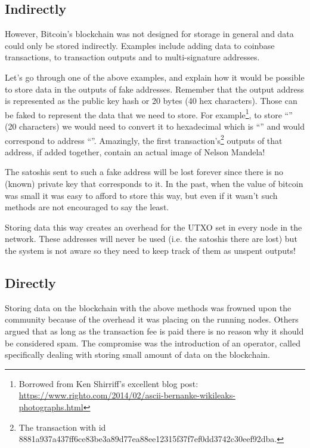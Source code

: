 \subsection*{Indirectly}
However, Bitcoin’s blockchain was not designed for storage in general and data could only be stored indirectly. Examples include adding data to coinbase transactions, to transaction outputs and to multi-signature addresses.

Let's go through one of the above examples, and explain how it would be possible to store data in the outputs of fake addresses. Remember that the output address is represented as the public key hash or 20 bytes (40 hex characters). Those can be faked to represent the data that we need to store. For example\footnote{Borrowed from Ken Shirriff's excellent blog post: \url{https://www.righto.com/2014/02/ascii-bernanke-wikileaks-photographs.html}}, to store ``'' (20 characters) we would need to convert it to hexadecimal which is ``'' and would correspond to address ``''. Amazingly, the first transaction's\footnote{The transaction with id 8881a937a437ff6ce83be3a89d77ea88ee12315f37f7ef0dd3742c30eef92dba.} outputs of that address, if added together,  contain an actual image of Nelson Mandela!

The satoshis sent to such a fake address will be lost forever since there is no (known) private key that corresponds to it. In the past, when the value of bitcoin was small it was easy to afford to store this way, but even if it wasn't such methods are not encouraged to say the least.

\begin{note}
Storing data this way creates an overhead for the UTXO set in every node in the network. These addresses will never be used (i.e. the satoshis there are lost) but the system is not aware so they need to keep track of them as unspent outputs!
\end{note}


\subsection*{Directly}
Storing data on the blockchain with the above methods was frowned upon the community because of the overhead it was placing on the running nodes. Others argued that as long as the transaction fee is paid there is no reason why it should be considered spam. The compromise was the introduction of an operator, called  specifically dealing with storing small amount of data on the blockchain.

